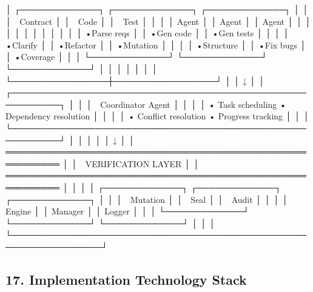 \documentclass[
]{article}
\newenvironment{Shaded}{}{}
\newcommand{\NormalTok}[1]{#1}
\begin{document}
\begin{Shaded}
\begin{Highlighting}[]
\NormalTok{│  ┌─────────────┐   ┌─────────────┐   ┌─────────────┐           │}
\NormalTok{│  │ 🤖 Contract │   │ 🤖 Code     │   │ 🤖 Test     │           │}
\NormalTok{│  │   Agent     │   │   Agent     │   │   Agent     │           │}
\NormalTok{│  │             │   │             │   │             │           │}
\NormalTok{│  │ •Parse reqs │   │ •Gen code   │   │ •Gen tests  │           │}
\NormalTok{│  │ •Clarify    │   │ •Refactor   │   │ •Mutation   │           │}
\NormalTok{│  │ •Structure  │   │ •Fix bugs   │   │ •Coverage   │           │}
\NormalTok{│  └─────────────┘   └─────────────┘   └─────────────┘           │}
\NormalTok{│         │                 │                 │                    │}
\NormalTok{│         └────────────────┼─────────────────┘                    │}
\NormalTok{│                          ↓                                       │}
\NormalTok{│  ┌──────────────────────────────────────────────────────────┐   │}
\NormalTok{│  │                  🤖 Coordinator Agent                    │   │}
\NormalTok{│  │  • Task scheduling        • Dependency resolution        │   │}
\NormalTok{│  │  • Conflict resolution    • Progress tracking            │   │}
\NormalTok{│  └──────────────────────────────────────────────────────────┘   │}
\NormalTok{│                              │                                   │}
\NormalTok{│                              ↓                                   │}
\NormalTok{│  ═══════════════════════════════════════════════════════════    │}
\NormalTok{│                    🤖 VERIFICATION LAYER                         │}
\NormalTok{│  ═══════════════════════════════════════════════════════════    │}
\NormalTok{│                                                                  │}
\NormalTok{│  ┌─────────────┐   ┌─────────────┐   ┌─────────────┐           │}
\NormalTok{│  │ 🤖 Mutation │   │ 🤖 Seal     │   │ 🤖 Audit    │           │}
\NormalTok{│  │   Engine    │   │   Manager   │   │   Logger    │           │}
\NormalTok{│  └─────────────┘   └─────────────┘   └─────────────┘           │}
\NormalTok{│                                                                  │}
\NormalTok{└─────────────────────────────────────────────────────────────────┘}
\end{Highlighting}
\end{Shaded}

\hypertarget{17-implementation-technology-stack}{%
\subsection{17. Implementation Technology
Stack}\label{17-implementation-technology-stack}}
\end{document}
